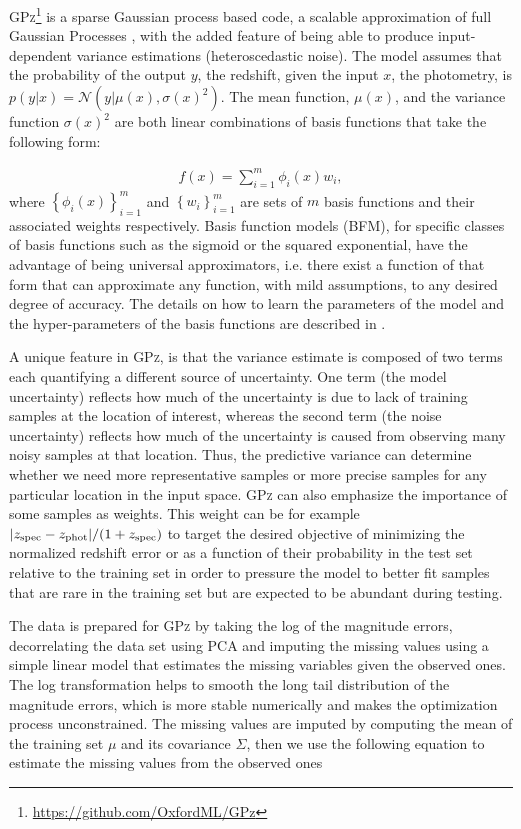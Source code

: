 \textsc{GPz}\footnote{\url{https://github.com/OxfordML/GPz}} \citep{Almosallam:16a,Almosallam:15b} is a sparse Gaussian process based code, a scalable approximation of full Gaussian Processes \citep{Rasmussen:06}, with the added feature of being able to produce input-dependent variance estimations (heteroscedastic noise). The model assumes that the probability of the output $y$, the redshift, given the input $x$, the photometry, is $p(y|x)=\mathcal{N}\left(y|\mu(x),\sigma(x)^{2}\right)$. The mean function, $\mu(x)$, and the variance function $\sigma(x)^{2}$ are both linear combinations of basis functions that take the following form:

\begin{align}
f(x)=\sum_{i=1}^{m}\phi_{i}(x)w_{i},
\end{align}
where $\left\{\phi_{i}(x)\right\}_{i=1}^{m}$ and $\left\{w_{i}\right\}_{i=1}^{m}$ are sets of $m$ basis functions and their associated weights respectively. Basis function models (BFM), for specific classes of basis functions such as the sigmoid or the squared exponential, have the advantage of being universal approximators, i.e. there exist a function of that form that can approximate any function, with mild assumptions, to any desired degree of accuracy. The details on how to learn the parameters of the model and the hyper-parameters of the basis functions are described in \citet{Almosallam:15b}.

A unique feature in \textsc{GPz}, is that the variance estimate is composed of two terms each quantifying a different source of uncertainty. One term (the model uncertainty) reflects how much of the uncertainty is due to lack of training samples at the location of interest, whereas the second term (the noise uncertainty) reflects how much of the uncertainty is caused from observing many noisy samples at that location. Thus, the predictive variance can determine whether we need more representative samples or more precise samples for any particular location in the input space. \textsc{GPz} can also emphasize the importance of some samples as weights. This weight can be for example $|z_{\rm{spec}}-z_{\rm{phot}}|/(1+z_{\rm{spec}})$ to target the desired objective of minimizing the normalized redshift error or as a function of their probability in the test set relative to the training set in order to pressure the model to better fit samples that are rare in the training set but are expected to be abundant during testing.

The data is prepared for \textsc{GPz} by taking the log of the magnitude errors, decorrelating the data set using PCA and imputing the missing values using a simple linear model that estimates the missing variables given the observed ones. The log transformation helps to smooth the long tail distribution of the magnitude errors, which is more stable numerically and makes the optimization process unconstrained. The missing values are imputed by computing the mean of the training set $\mu$ and its covariance $\Sigma$, then we use the following equation to estimate the missing values from the observed ones %

